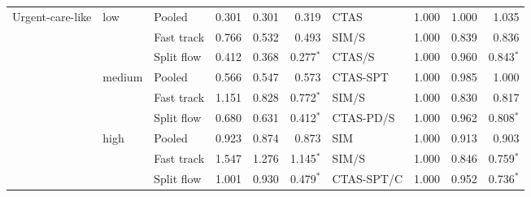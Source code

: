 \begin{tabular}{lllrrrlrrr}
Urgent-care-like & low & Pooled & 0.301 & 0.301 & 0.319 & CTAS & 1.000 & 1.000 & 1.035 \\
 &  & Fast track & 0.766 & 0.532 & 0.493 & SIM/S & 1.000 & 0.839 & 0.836 \\
 &  & Split flow & 0.412 & 0.368 & 0.277$^{*}$ & CTAS/S & 1.000 & 0.960 & 0.843$^{*}$ \\
 & medium & Pooled & 0.566 & 0.547 & 0.573 & CTAS-SPT & 1.000 & 0.985 & 1.000 \\
 &  & Fast track & 1.151 & 0.828 & 0.772$^{*}$ & SIM/S & 1.000 & 0.830 & 0.817 \\
 &  & Split flow & 0.680 & 0.631 & 0.412$^{*}$ & CTAS-PD/S & 1.000 & 0.962 & 0.808$^{*}$ \\
 & high & Pooled & 0.923 & 0.874 & 0.873 & SIM & 1.000 & 0.913 & 0.903 \\
 &  & Fast track & 1.547 & 1.276 & 1.145$^{*}$ & SIM/S & 1.000 & 0.846 & 0.759$^{*}$ \\
 &  & Split flow & 1.001 & 0.930 & 0.479$^{*}$ & CTAS-SPT/C & 1.000 & 0.952 & 0.736$^{*}$ \\
\bottomrule
\end{tabular}
